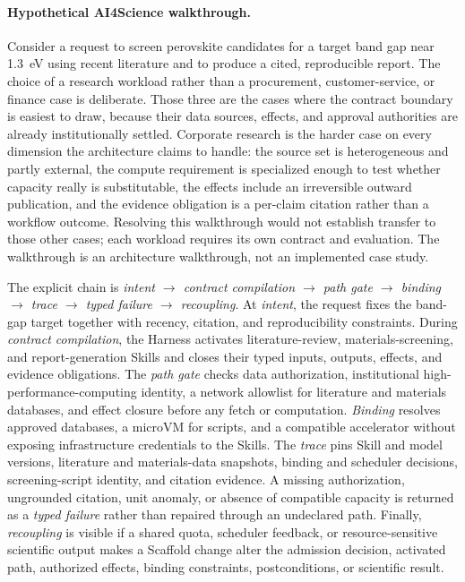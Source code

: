 \documentclass[11pt]{article}
\begin{document}
\paragraph{Hypothetical AI4Science walkthrough.}
Consider a request to screen perovskite candidates for a target band gap near 1.3~eV using recent literature and to produce a cited, reproducible report. The choice of a research workload rather than a procurement, customer-service, or finance case is deliberate. Those three are the cases where the contract boundary is easiest to draw, because their data sources, effects, and approval authorities are already institutionally settled. Corporate research is the harder case on every dimension the architecture claims to handle: the source set is heterogeneous and partly external, the compute requirement is specialized enough to test whether capacity really is substitutable, the effects include an irreversible outward publication, and the evidence obligation is a per-claim citation rather than a workflow outcome. Resolving this walkthrough would not establish transfer to those other cases; each workload requires its own contract and evaluation. The walkthrough is an architecture walkthrough, not an implemented case study.

The explicit chain is \textit{intent $\rightarrow$ contract compilation $\rightarrow$ path gate $\rightarrow$ binding $\rightarrow$ trace $\rightarrow$ typed failure $\rightarrow$ recoupling}. At \textit{intent}, the request fixes the band-gap target together with recency, citation, and reproducibility constraints. During \textit{contract compilation}, the Harness activates literature-review, materials-screening, and report-generation Skills and closes their typed inputs, outputs, effects, and evidence obligations. The \textit{path gate} checks data authorization, institutional high-performance-computing identity, a network allowlist for literature and materials databases, and effect closure before any fetch or computation. \textit{Binding} resolves approved databases, a microVM for scripts, and a compatible accelerator without exposing infrastructure credentials to the Skills. The \textit{trace} pins Skill and model versions, literature and materials-data snapshots, binding and scheduler decisions, screening-script identity, and citation evidence. A missing authorization, ungrounded citation, unit anomaly, or absence of compatible capacity is returned as a \textit{typed failure} rather than repaired through an undeclared path. Finally, \textit{recoupling} is visible if a shared quota, scheduler feedback, or resource-sensitive scientific output makes a Scaffold change alter the admission decision, activated path, authorized effects, binding constraints, postconditions, or scientific result.
\end{document}
